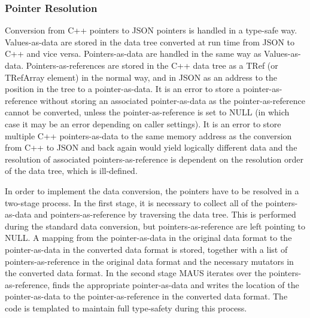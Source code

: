 \subsubsection{Pointer Resolution}
Conversion from C++ pointers to JSON pointers is handled in a type-safe way. Values-as-data are stored in the data tree converted at run time from JSON to C++ and vice versa. Pointers-as-data are handled in the same way as Values-as-data. Pointers-as-references are stored in the C++ data tree as a TRef (or TRefArray element) in the normal way, and in JSON as an address to the position in the tree to a pointer-as-data. It is an error to store a pointer-as-reference without storing an associated pointer-as-data as the pointer-as-reference cannot be converted, unless the pointer-as-reference is set to NULL (in which case it may be an error depending on caller settings). It is an error to store multiple C++ pointers-as-data to the same memory address as the conversion from C++ to JSON and back again would yield logically different data and the resolution of associated pointers-as-reference is dependent on the resolution order of the data tree, which is ill-defined.

In order to implement the data conversion, the pointers have to be resolved in a two-stage process. In the first stage, it is necessary to collect all of the pointers-as-data and pointers-as-reference by traversing the data tree. This is performed during the standard data conversion, but pointers-as-reference are left pointing to NULL. A mapping from the pointer-as-data in the original data format to the pointer-as-data in the converted data format is stored, together with a list of pointers-as-reference in the original data format and the necessary mutators in the converted data format. In the second stage MAUS iterates over the pointers-as-reference, finds the appropriate pointer-as-data and writes the location of the pointer-as-data to the pointer-as-reference in the converted data format. The code is templated to maintain full type-safety during this process.
